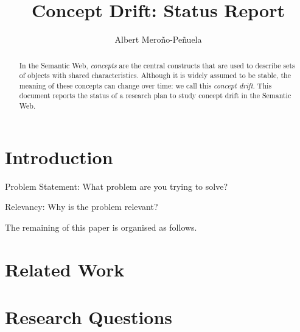 \documentclass{llncs}
\begin{document}
\mainmatter %

\title{Concept Drift: Status Report} 

\author{Albert Mero\~{n}o-Pe\~{n}uela}

%
%


\maketitle
\begin{abstract}
In the Semantic Web, \emph{concepts} are the central constructs that
are used to describe sets of objects with shared
characteristics. Although it is widely assumed to be stable, the
meaning of these concepts can change over time: we call this
\emph{concept drift}. This document reports the status of a research
plan to study concept drift in the Semantic Web.
\end{abstract}

\section{Introduction}
\label{sec:intro}

Problem Statement: What problem are you trying to solve?

Relevancy: Why is the problem relevant?

The remaining of this paper is organised as follows.

\section{Related Work}
\label{sec:related-work}

\section{Research Questions}
\end{document}
